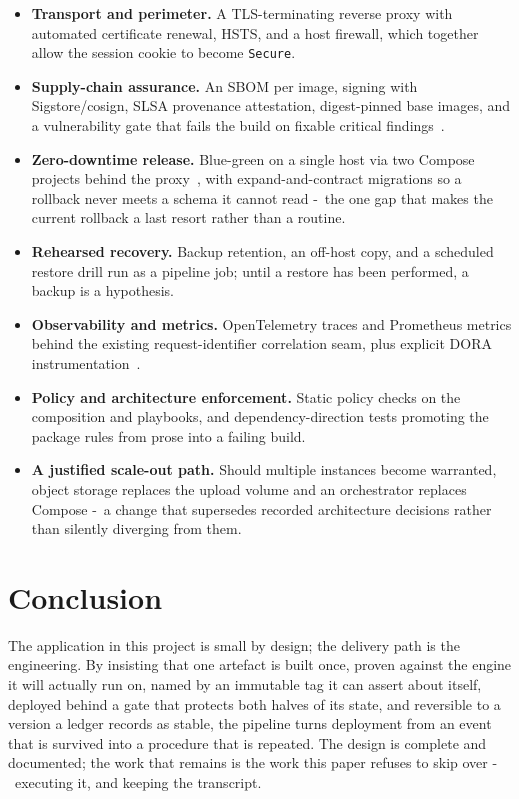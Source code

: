 \documentclass[10pt,a4paper]{article}
\begin{document}
\begin{itemize}
  \item \textbf{Transport and perimeter.} A TLS-terminating reverse proxy with automated
        certificate renewal, HSTS, and a host firewall, which together allow the session cookie to
        become \texttt{Secure}.
  \item \textbf{Supply-chain assurance.} An SBOM per image, signing with Sigstore/cosign, SLSA
        provenance attestation, digest-pinned base images, and a vulnerability gate that fails the
        build on fixable critical findings~\cite{slsa,nist800190}.
  \item \textbf{Zero-downtime release.} Blue-green on a single host via two Compose projects
        behind the proxy~\cite{fowlerbg}, with expand-and-contract migrations so a rollback never
        meets a schema it cannot read -\ the one gap that makes the current rollback a
        last resort rather than a routine.
  \item \textbf{Rehearsed recovery.} Backup retention, an off-host copy, and a scheduled restore
        drill run as a pipeline job; until a restore has been performed, a backup is a hypothesis.
  \item \textbf{Observability and metrics.} OpenTelemetry traces and Prometheus metrics behind
        the existing request-identifier correlation seam, plus explicit DORA
        instrumentation~\cite{dora2024}.
  \item \textbf{Policy and architecture enforcement.} Static policy checks on the composition and
        playbooks, and dependency-direction tests promoting the package rules from prose into a
        failing build.
  \item \textbf{A justified scale-out path.} Should multiple instances become warranted,
        object storage replaces the upload volume and an orchestrator replaces Compose
        -\ a change that supersedes recorded architecture decisions rather than
        silently diverging from them.
\end{itemize}

\section{Conclusion}

The application in this project is small by design; the delivery path is the engineering. By
insisting that one artefact is built once, proven against the engine it will actually run on,
named by an immutable tag it can assert about itself, deployed behind a gate that protects both
halves of its state, and reversible to a version a ledger records as stable, the pipeline turns
deployment from an event that is survived into a procedure that is repeated. The design is
complete and documented; the work that remains is the work this paper refuses to skip over
-\ executing it, and keeping the transcript.
\end{document}
